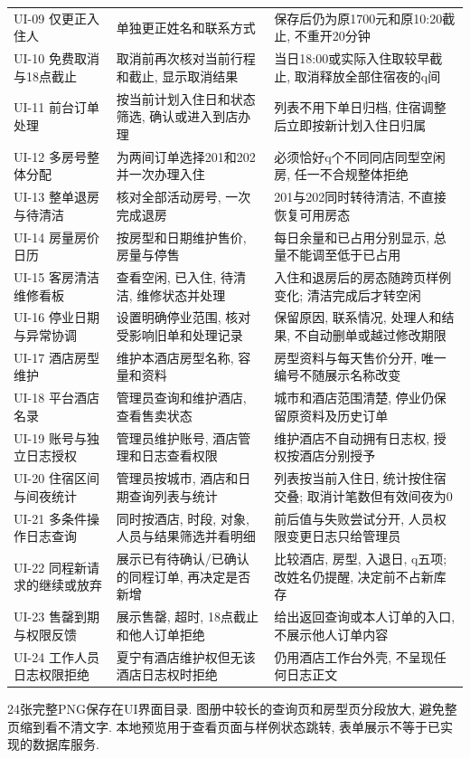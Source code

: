 \documentclass[cn,nofont,11pt,a4paper]{elegantpaper}
\begin{document}
\begin{longtable}{>{\RaggedRight\arraybackslash}p{}>{\RaggedRight\arraybackslash}p{}>{\RaggedRight\arraybackslash}p{}}
UI-09 仅更正入住人 & 单独更正姓名和联系方式 & 保存后仍为原1700元和原10:20截止, 不重开20分钟 \\
UI-10 免费取消与18点截止 & 取消前再次核对当前行程和截止, 显示取消结果 & 当日18:00或实际入住取较早截止, 取消释放全部住宿夜的q间 \\
UI-11 前台订单处理 & 按当前计划入住日和状态筛选, 确认或进入到店办理 & 列表不用下单日归档, 住宿调整后立即按新计划入住日归属 \\
UI-12 多房号整体分配 & 为两间订单选择201和202并一次办理入住 & 必须恰好q个不同同店同型空闲房, 任一不合规整体拒绝 \\
UI-13 整单退房与待清洁 & 核对全部活动房号, 一次完成退房 & 201与202同时转待清洁, 不直接恢复可用房态 \\
UI-14 房量房价日历 & 按房型和日期维护售价, 房量与停售 & 每日余量和已占用分别显示, 总量不能调至低于已占用 \\
UI-15 客房清洁维修看板 & 查看空闲, 已入住, 待清洁, 维修状态并处理 & 入住和退房后的房态随跨页样例变化; 清洁完成后才转空闲 \\
UI-16 停业日期与异常协调 & 设置明确停业范围, 核对受影响旧单和处理记录 & 保留原因, 联系情况, 处理人和结果, 不自动删单或越过修改期限 \\
UI-17 酒店房型维护 & 维护本酒店房型名称, 容量和资料 & 房型资料与每天售价分开, 唯一编号不随展示名称改变 \\
UI-18 平台酒店名录 & 管理员查询和维护酒店, 查看售卖状态 & 城市和酒店范围清楚, 停业仍保留原资料及历史订单 \\
UI-19 账号与独立日志授权 & 管理员维护账号, 酒店管理和日志查看权限 & 维护酒店不自动拥有日志权, 授权按酒店分别授予 \\
UI-20 住宿区间与间夜统计 & 管理员按城市, 酒店和日期查询列表与统计 & 列表按当前入住日, 统计按住宿交叠; 取消计笔数但有效间夜为0 \\
UI-21 多条件操作日志查询 & 同时按酒店, 时段, 对象, 人员与结果筛选并看明细 & 前后值与失败尝试分开, 人员权限变更日志只给管理员 \\
UI-22 同程新请求的继续或放弃 & 展示已有待确认/\allowbreak{}已确认的同程订单, 再决定是否新增 & 比较酒店, 房型, 入退日, q五项; 改姓名仍提醒, 决定前不占新库存 \\
UI-23 售罄到期与权限反馈 & 展示售罄, 超时, 18点截止和他人订单拒绝 & 给出返回查询或本人订单的入口, 不展示他人订单内容 \\
UI-24 工作人员日志权限拒绝 & 夏宁有酒店维护权但无该酒店日志权时拒绝 & 仍用酒店工作台外壳, 不呈现任何日志正文 \\
\end{longtable}\endgroup
24张完整PNG保存在UI界面目录. 图册中较长的查询页和房型页分段放大, 避免整页缩到看不清文字. 本地预览用于查看页面与样例状态跳转, 表单展示不等于已实现的数据库服务.
\end{document}
